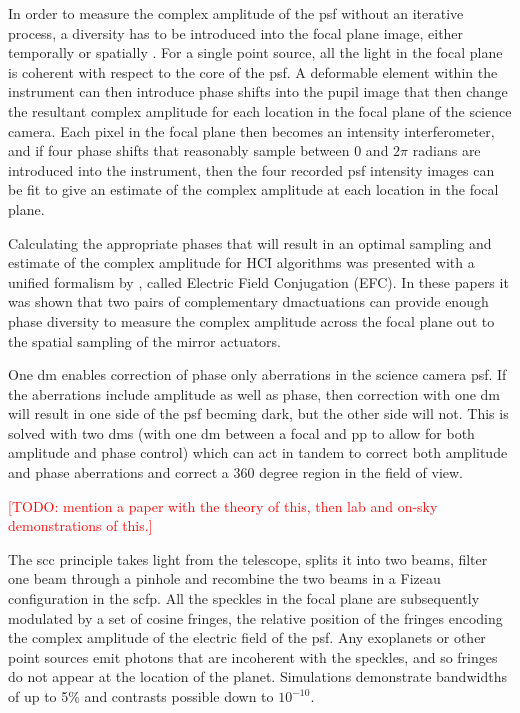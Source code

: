 \documentclass[letterpaper]{ar-1col}
\newcommand{\todo}[1]{\textcolor{red}{[TODO: #1]}}
\begin{document}
In order to measure the complex amplitude of the \ac{psf} without an iterative process, a diversity has to be introduced into the focal plane image, either temporally or spatially \citep[see ][ for a review of these]{Fienup13,Gonsalves14}.
%
For a single point source, all the light in the focal plane is coherent with respect to the core of the \ac{psf}.
%
A deformable element within the instrument can then introduce phase shifts into the pupil image that then change the resultant complex amplitude for each location in the focal plane of the science camera.
%
Each pixel in the focal plane then becomes an intensity interferometer, and if four phase shifts that reasonably sample between $0$ and $2\pi$ radians are introduced into the instrument, then the four recorded \ac{psf} intensity images can be fit to give an estimate of the complex amplitude at each location in the focal plane.

Calculating the appropriate phases that will result in an optimal sampling and estimate of the complex amplitude for HCI algorithms was presented with a unified formalism by \citet{Giveon09,Giveon10}, called Electric Field Conjugation (EFC).
%
In these papers it was shown that two pairs of complementary \ac{dm}actuations can provide enough phase diversity to measure the complex amplitude across the focal plane out to the spatial sampling of the mirror actuators.

%

One \ac{dm} enables correction of phase only aberrations in the science camera \ac{psf}.
%
If the aberrations include amplitude as well as phase, then correction with one \ac{dm} will result in one side of the \ac{psf} becming dark, but the other side will not.
%
This is solved with two \acp{dm} (with one \ac{dm} between a focal and \ac{pp} to allow for both amplitude and phase control) which can act in tandem to correct both amplitude and phase aberrations and correct a 360 degree region in the field of view.
%

\todo{mention a paper with the theory of this, then lab and on-sky demonstrations of this.}


%
The \acl{scc} \citep[\acs{scc}; ][]{Baudoz06} principle takes light from the telescope, splits it into two beams, filter one beam through a pinhole and recombine the two beams in a Fizeau configuration in the \ac{scfp}.
%
All the speckles in the focal plane are subsequently modulated by a set of cosine fringes, the relative position of the fringes encoding the complex amplitude of the electric field of the \ac{psf}.
%
Any exoplanets or other point sources emit photons that are incoherent with the speckles, and so fringes do not appear at the location of the planet.
%
Simulations demonstrate \citep{Galicher10} bandwidths of up to 5\% and contrasts possible down to $10^{-10}$.
\end{document}
